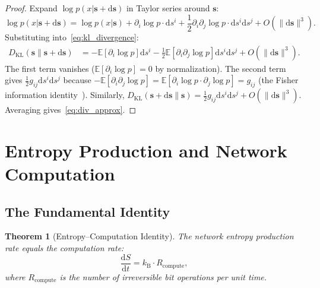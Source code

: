 \documentclass[11pt,twocolumn,a4paper]{article}
\newtheorem{theorem}{Theorem}[section]
\theoremstyle{definition}
\newcommand{\kB}{k_{\mathrm{B}}}
\newcommand{\dif}{\mathrm{d}}
\begin{document}
\begin{proof}
Expand $\log p(x|\mathbf{s} + \dif\mathbf{s})$ in Taylor series around $\mathbf{s}$:
\begin{equation}
  \log p(x|\mathbf{s} + \dif\mathbf{s}) = \log p(x|\mathbf{s})
  + \partial_i \log p \cdot \dif s^i
  + \frac{1}{2}\partial_i \partial_j \log p \cdot \dif s^i \dif s^j + O(\|\dif\mathbf{s}\|^3).
\end{equation}
Substituting into~\eqref{eq:kl_divergence}:
\begin{align}
  D_{\mathrm{KL}}(\mathbf{s} \| \mathbf{s} + \dif\mathbf{s})
  &= -\mathbb{E}[\partial_i \log p] \dif s^i
     - \frac{1}{2}\mathbb{E}[\partial_i\partial_j \log p] \dif s^i \dif s^j + O(\|\dif\mathbf{s}\|^3).
\end{align}
The first term vanishes ($\mathbb{E}[\partial_i \log p] = 0$ by normalization). The second
term gives $\frac{1}{2}g_{ij}\dif s^i\dif s^j$ because
$-\mathbb{E}[\partial_i\partial_j\log p] = \mathbb{E}[\partial_i\log p \cdot \partial_j\log p] = g_{ij}$
(the Fisher information identity~\cite{cover2006}). Similarly,
$D_{\mathrm{KL}}(\mathbf{s} + \dif\mathbf{s} \| \mathbf{s}) = \frac{1}{2}g_{ij}\dif s^i\dif s^j
+ O(\|\dif\mathbf{s}\|^3)$. Averaging gives~\eqref{eq:div_approx}.
\end{proof}


\section{Entropy Production and Network Computation}\label{sec:entropy_production}

\subsection{The Fundamental Identity}\label{sec:ep:fundamental}

\begin{theorem}[Entropy--Computation Identity]\label{thm:entropy_compute}
The network entropy production rate equals the computation rate:
\begin{equation}\label{eq:entropy_compute}
  \frac{\dif S}{\dif t} = \kB \cdot R_{\mathrm{compute}},
\end{equation}
where $R_{\mathrm{compute}}$ is the number of irreversible bit operations per unit time.
\end{theorem}
\end{document}
